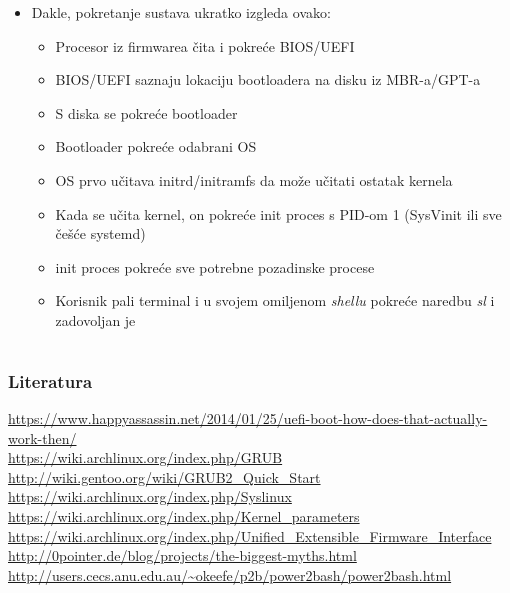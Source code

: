 \documentclass[t]{beamer}
\begin{document}
\begin{frame}
	\begin{itemize}
		\item Dakle, pokretanje sustava ukratko izgleda ovako:
		\begin{itemize}
			\item Procesor iz firmwarea čita i pokreće BIOS/UEFI
			\item BIOS/UEFI saznaju lokaciju bootloadera na disku iz MBR-a/GPT-a
			\item S diska se pokreće bootloader
			\item Bootloader pokreće odabrani OS
			\item OS prvo učitava initrd/initramfs da može učitati ostatak kernela
			\item Kada se učita kernel, on pokreće init proces s PID-om 1 (SysVinit ili sve češće systemd)
			\item init proces pokreće sve potrebne pozadinske procese
			\item Korisnik pali terminal i u svojem omiljenom \textit{shellu} pokreće naredbu \textit{sl} i zadovoljan je
		\end{itemize}
	\end{itemize}
\end{frame}



\section*{}
\begin{frame}
	\frametitle{Literatura}
	\url{https://www.happyassassin.net/2014/01/25/uefi-boot-how-does-that-actually-work-then/} \\
	\vfill
	\url{https://wiki.archlinux.org/index.php/GRUB} \\
	\url{http://wiki.gentoo.org/wiki/GRUB2_Quick_Start} \\
	\url{https://wiki.archlinux.org/index.php/Syslinux}
	\vfill
	\url{https://wiki.archlinux.org/index.php/Kernel_parameters} \\
	\url{https://wiki.archlinux.org/index.php/Unified_Extensible_Firmware_Interface}
	\vfill
	\url{http://0pointer.de/blog/projects/the-biggest-myths.html}
	\vfill
	\url{http://users.cecs.anu.edu.au/~okeefe/p2b/power2bash/power2bash.html}\\
\end{frame}
\end{document}
